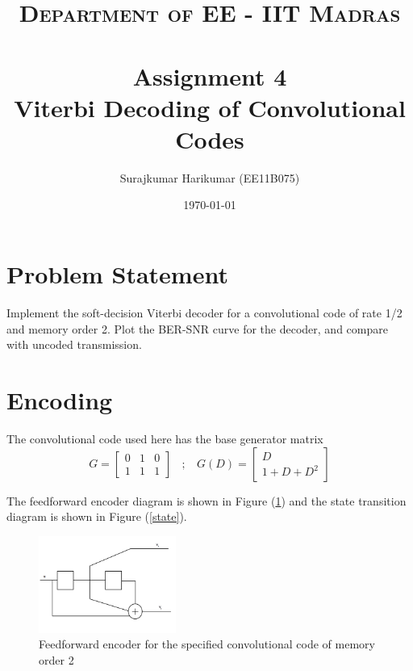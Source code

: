 \documentclass[paper=a4, fontsize=12pt]{scrartcl} %
\title{	
\normalfont \normalsize 
\textsc{Department of EE - IIT Madras} \\ [25pt] %
\horrule{0.5pt} \\[0.4cm] %
\huge Assignment 4 \\Viterbi Decoding of Convolutional Codes %
\horrule{2pt} \\[0.5cm] %
}
\author{Surajkumar Harikumar (EE11B075)} %
\date{\normalsize\today} %
\numberwithin{equation}{section} %
\numberwithin{figure}{section} %
\numberwithin{table}{section} %
\begin{document}
\maketitle %


\section{Problem Statement}

Implement the soft-decision Viterbi decoder for a convolutional code of rate 1/2 and memory order 2. Plot the BER-SNR curve for the decoder, and compare with uncoded transmission. 

\section{Encoding}

The convolutional code used here has the base generator matrix
\begin{equation}
G = \begin{bmatrix}
       0 & 1 & 0           \\[0.3em]
       1 & 1 & 1
     \end{bmatrix} \:\:\:\: ; \:\:\:\: 
     G(D) = \begin{bmatrix}
      D          \\[0.3em]
       1+D+D^2
     \end{bmatrix}
\end{equation}

The feedforward encoder diagram is shown in Figure (\ref{enc}) and the state transition diagram is shown in Figure (\ref{state}). 

\begin{figure}[h]
\centering
\includegraphics[width=0.4\textwidth]{images/enc}
\caption{Feedforward encoder for the specified convolutional code of memory order 2}
\label{enc}
\end{figure}
\end{document}
